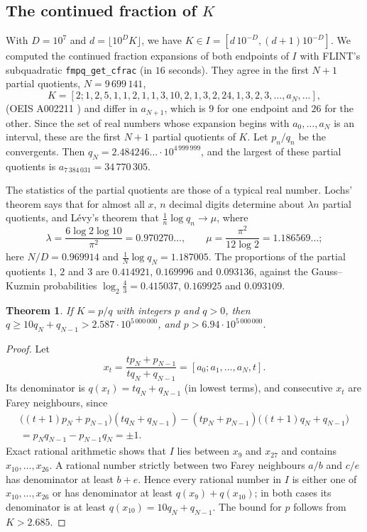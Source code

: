 \documentclass[11pt]{amsart}
\newtheorem{theorem}{Theorem}[section]
\theoremstyle{definition}
\theoremstyle{remark}
\begin{document}
\subsection{The continued fraction of $K$}\label{sec:khcf}
With $D = 10^7$ and $d = \lfloor 10^DK\rfloor$, we have $K \in I = [d\,10^{-D}, (d+1)10^{-D}]$. We computed the
continued fraction expansions of both endpoints of $I$ with FLINT's subquadratic \texttt{fmpq\_get\_cfrac} (in
$16$ seconds). They agree in the first $N + 1$ partial quotients, $N = 9\,699\,141$,
\[
  K = [2; 1, 2, 5, 1, 1, 2, 1, 1, 3, 10, 2, 1, 3, 2, 24, 1, 3, 2, 3, \ldots, a_N, \ldots],
\]
(OEIS A002211 \cite{OEIS}) and differ in $a_{N+1}$, which is $9$ for one endpoint and $26$ for the other. Since the set of
real numbers whose expansion begins with $a_0, \ldots, a_N$ is an interval, these are the first $N + 1$ partial quotients of
$K$. Let $p_n/q_n$ be the convergents. Then $q_N = 2.484246\ldots\cdot10^{4\,999\,999}$, and the largest of these
partial quotients is $a_{7\,384\,031} = 34\,770\,305$.

The statistics of the partial quotients are those of a typical real number. Lochs' theorem \cite{Loc64} says that
for almost all $x$, $n$ decimal digits determine about $\lambda n$ partial quotients, and L\'evy's theorem
\cite{Lev36} that $\frac1n\log q_n \to \mu$, where
\[
  \lambda = \frac{6\log2\log10}{\pi^2} = 0.970270\ldots, \qquad \mu = \frac{\pi^2}{12\log2} = 1.186569\ldots;
\]
here $N/D = 0.969914$ and $\frac1N\log q_N = 1.187005$. The proportions of the partial quotients $1$, $2$ and $3$ are
$0.414921$, $0.169996$ and $0.093136$, against the Gauss--Kuzmin probabilities $\log_2\frac43 = 0.415037$, $0.169925$
and $0.093109$.

\begin{theorem}\label{thm:khrat}
If $K = p/q$ with integers $p$ and $q > 0$, then $q \ge 10q_N + q_{N-1} > 2.587\cdot10^{5\,000\,000}$, and
$p > 6.94\cdot10^{5\,000\,000}$.
\end{theorem}

\begin{proof}
Let
\[
  x_t = \frac{tp_N + p_{N-1}}{tq_N + q_{N-1}} = [a_0; a_1, \ldots, a_N, t].
\]
Its denominator is $q(x_t) = tq_N + q_{N-1}$ (in lowest terms), and consecutive $x_t$ are Farey neighbours, since
\begin{multline*}
  \bigl((t+1)p_N + p_{N-1}\bigr)(tq_N + q_{N-1}) - (tp_N + p_{N-1})\bigl((t+1)q_N + q_{N-1}\bigr) \\
  = p_Nq_{N-1} - p_{N-1}q_N = \pm1.
\end{multline*}
Exact rational arithmetic shows that $I$ lies
between $x_9$ and $x_{27}$ and contains $x_{10}, \ldots, x_{26}$. A rational number strictly between two Farey
neighbours $a/b$ and $c/e$ has denominator at least $b + e$. Hence every rational number in $I$ is either one of
$x_{10}, \ldots, x_{26}$ or has denominator at least $q(x_9) + q(x_{10})$; in both cases its denominator is at least
$q(x_{10}) = 10q_N + q_{N-1}$. The bound for $p$ follows from $K > 2.685$.
\end{proof}
\end{document}
